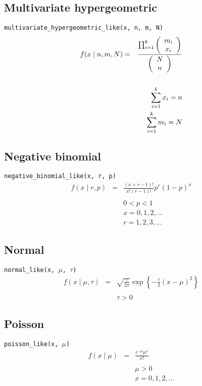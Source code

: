 \subsection*{Multivariate hypergeometric}
\verb=multivariate_hypergeometric_like(x, n, m, N)=
\begin{eqnarray*}
f(x \mid n, m, N) &=& \frac{\prod_{i=1}^k \left(\begin{array}{c}m_i \\x_i\end{array}\right)}{\left(\begin{array}{c}N \\n\end{array}\right)} \\
\vspace{3cm}\\
&& \sum_{i=1}^k x_i = n\\
&& \sum_{i=1}^k m_i = N
\end{eqnarray*}

\subsection*{Negative binomial}
\verb=negative_binomial_like(x, r, p)=
\begin{eqnarray*}
f(x \mid r, p) &=& \frac{(x+r-1)!}{x! (r-1)!} p^r (1-p)^x \\
\\
&&0 < p < 1 \\
&&x = 0,1,2,\ldots \\
&&r=1,2,3,\ldots
\end{eqnarray*}

\subsection*{Normal}
\verb=normal_like(x, =$\mu$\verb=, =$\tau$\verb=)=
\begin{eqnarray*}
f(x \mid \mu, \tau) &=& \sqrt{\frac{\tau}{2\pi}} \exp\left\{ -\frac{\tau}{2} (x-\mu)^2 \right\}\\
\\
&& \tau > 0
\end{eqnarray*}

\subsection*{Poisson}
\verb=poisson_like(x, =$\mu$\verb=)=
\begin{eqnarray*}
f(x \mid \mu) &=& \frac{e^{-\mu}\mu^x}{x!}\\
\\
&& \mu > 0\\
&& x = 0,1,2,\ldots
\end{eqnarray*}

